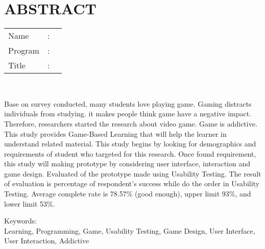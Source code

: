 %
%
%

	\chapter*{ABSTRACT}

\vspace*{0.2cm}

\noindent \begin{tabular}{l l p{11.0cm}}
	Name&: & \penulis \\
	Program&: & \programEng \\
	Title&: & \judulInggris \\
\end{tabular} \\ 

\vspace*{0.5cm}

\noindent 
Base on survey conducted, many students love playing game. Gaming distracts individuals from studying. it makes people think game have a negative impact. Therefore, researchers started the research about video game. Game is addictive. This study provides Game-Based Learning that will help the learner in understand related material. This study begins by looking for demographics and requirements of student who targeted for this research. Once found requirement, this study will making prototype by considering user interface, interaction and game design. Evaluated of the prototype made using Usability Testing. The result of evaluation is percentage of respondent's success while do the order in Usability Testing. Average complete rate is 78.57\% (good enough), upper limit 93\%, and lower limit 53\%.

\vspace*{0.2cm}

\noindent Keywords: \\ 
\noindent Learning, Programming, Game, Usability Testing, Game Design, User Interface, User Interaction, Addictive\\

\newpage
